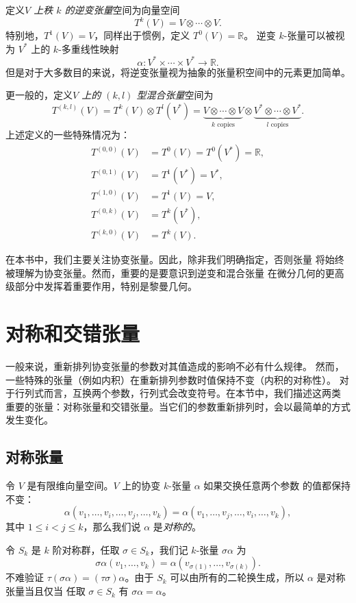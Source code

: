 \documentclass[fontset=none]{Notes}
\begin{document}
定义\emph{$V$ 上秩 $k$ 的逆变张量}空间为向量空间
\[
  T^k(V)=V\otimes \cdots\otimes V.  
\]
特别地，$T^1(V)=V$，同样出于惯例，定义 $T^0(V)=\mathbb{R}$。
逆变 $k$-张量可以被视为 $V^*$ 上的 $k$-多重线性映射
\[
  \alpha:V^*\times \cdots\times V^*\to \mathbb{R} . 
\]
但是对于大多数目的来说，将逆变张量视为抽象的张量积空间中的元素更加简单。

更一般的，定义\emph{$V$ 上的 $(k,l)$ 型混合张量}空间为
\[
  T^{(k,l)}(V)=T^k(V)\otimes T^l(V^*)=\underbrace{V\otimes\cdots\otimes V}_{\text{$k$ copies}}  
  \otimes \underbrace{V^*\otimes\cdots\otimes V^*}_{\text{$l$ copies}}.
\]
上述定义的一些特殊情况为：
\begin{align*}
  T^{(0,0)}(V)&=T^0(V)=T^0(V^*)=\mathbb{R},\\
  T^{(0,1)}(V)&=T^1(V^*)=V^*,\\
  T^{(1,0)}(V)&=T^1(V)=V,\\
  T^{(0,k)}(V)&=T^k(V^*),\\
  T^{(k,0)}(V)&=T^k(V).
\end{align*}

在本书中，我们主要关注协变张量。因此，除非我们明确指定，否则张量
将始终被理解为协变张量。然而，重要的是要意识到逆变和混合张量
在微分几何的更高级部分中发挥着重要作用，特别是黎曼几何。

\section{对称和交错张量}

一般来说，重新排列协变张量的参数对其值造成的影响不必有什么规律。
然而，一些特殊的张量（例如内积）在重新排列参数时值保持不变（内积的对称性）。
对于行列式而言，互换两个参数，行列式会改变符号。在本节中，我们描述这两类
重要的张量：对称张量和交错张量。当它们的参数重新排列时，会以最简单的方式发生变化。

\subsection{对称张量}

令 $V$ 是有限维向量空间。$V$ 上的协变 $k$-张量 $\alpha$ 如果交换任意两个参数
的值都保持不变：
\[
  \alpha(v_1,\dots,v_i,\dots,v_j,\dots,v_k)=
  \alpha(v_1,\dots,v_j,\dots,v_i,\dots,v_k),
\]
其中 $1\leq i<j\leq k$，那么我们说 $\alpha$ 是\emph{对称的}。

令 $S_k$ 是 $k$ 阶对称群，任取 $\sigma\in S_k$，我们记
$k$-张量 $\sigma\alpha$ 为
\[
  \sigma\alpha(v_1,\dots,v_k)=\alpha(v_{\sigma(1)},\dots,v_{\sigma(k)}).  
\]
不难验证 $\tau(\sigma\alpha)=(\tau\sigma)\alpha$。由于
$S_k$ 可以由所有的二轮换生成，所以 $\alpha$ 是对称张量当且仅当
任取 $\sigma\in S_k$ 有 $\sigma\alpha=\alpha$。
\end{document}

